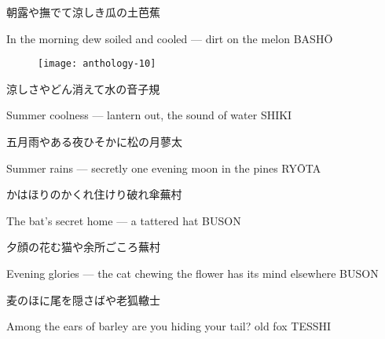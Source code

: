 \begin{haiku}
    {\FH 朝露や撫でて涼しき瓜の土}\hfill{\FH 芭蕉}

    \vin{} In the morning dew
    \vin{} \vin{} soiled and cooled ---
    \vin{} \vin{} \vin{} dirt on the melon \hspace{\fill} BASH\={O}
\end{haiku}

\begin{figure}
    \texttt{[image: anthology-10]}
\end{figure}

\begin{haiku}
    {\FH 涼しさやどん消えて水の音}\hfill{\FH 子規}

    \vin{} Summer coolness ---
    \vin{} \vin{} lantern out,
    \vin{} \vin{} \vin{} the sound of water \hspace{\fill} SHIKI
\end{haiku}

\begin{haiku}
    {\FH 五月雨やある夜ひそかに松の月}\hfill{\FH 蓼太}

    \vin{} Summer rains ---
    \vin{} \vin{} secretly one evening
    \vin{} \vin{} \vin{} moon in the pines \hspace{\fill} RY\={O}TA
\end{haiku}

\begin{haiku}
    {\FH かはほりのかくれ住けり破れ傘}\hfill{\FH 蕪村}

    \vin{} The bat's
    \vin{} \vin{} secret home ---
    \vin{} \vin{} \vin{} a tattered hat \hspace{\fill} BUSON
\end{haiku}

\begin{haiku}
    {\FH 夕顔の花む猫や余所ごころ}\hfill{\FH 蕪村}

    \vin{} Evening glories ---
    \vin{} \vin{} the cat chewing the flower
    \vin{} \vin{} \vin{} has its mind elsewhere \hspace{\fill} BUSON
\end{haiku}

\begin{haiku}
    {\FH 麦のほに尾を隠さばや老狐}\hfill{\FH 轍士}

    \vin{} Among the ears of barley
    \vin{} \vin{} are you hiding your tail?
    \vin{} \vin{} \vin{} old fox \hspace{\fill} TESSHI
\end{haiku}

